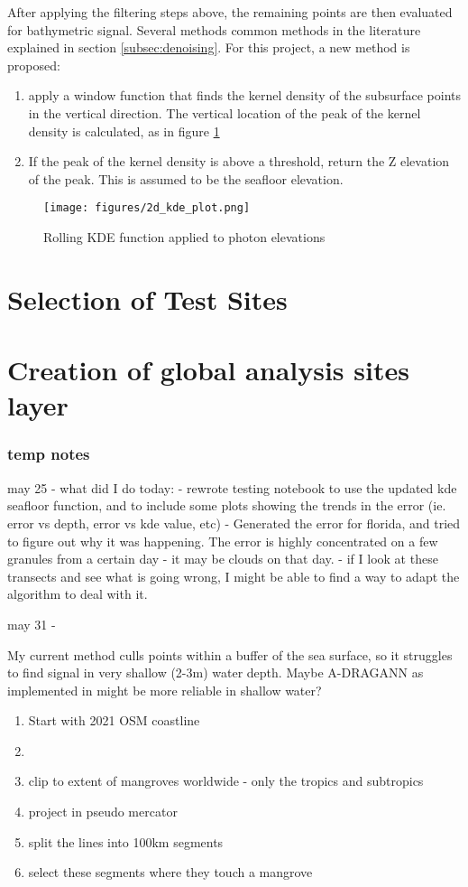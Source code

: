 After applying the filtering steps above, the remaining points are then evaluated for bathymetric signal. Several methods common methods in the literature explained in section \ref{subsec:denoising}. For this project, a new method is proposed:


\begin{enumerate}
    \item apply a window function that finds the kernel density of the subsurface points in the vertical direction. The vertical location of the peak of the kernel density is calculated, as in figure \ref{fig:kdefunc}
    \item If the peak of the kernel density is above a threshold, return the Z elevation of the peak. This is assumed to be the seafloor elevation.
\end{enumerate}

\begin{figure}[htbp]
    \centering
    \texttt{[image: figures/2d\_kde\_plot.png]}
    \caption{Rolling KDE function applied to photon elevations}
    \label{fig:kdefunc}
\end{figure}

\section{Selection of Test Sites}
\section{Creation of global analysis sites layer}
\subsubsection*{temp notes}

may 25 - what did I do today:
- rewrote testing notebook to use the updated kde seafloor function, and to include some plots showing the trends in the error (ie. error vs depth, error vs kde value, etc)
- Generated the error for florida, and tried to figure out why it was happening. The error is highly concentrated on a few granules from a certain day - it may be clouds on that day.
- if I look at these transects and see what is going wrong, I might be able to find a way to adapt the algorithm to deal with it.

may 31 -

My current method culls points within a buffer of the sea surface, so it struggles to find signal in very shallow (2-3m) water depth. Maybe A-DRAGANN as implemented in \cite{Cao2021} might be more reliable in shallow water?
\begin{enumerate}
    \color{orange}
    \item Start with 2021 OSM coastline
    \item 
    \item clip to extent of mangroves worldwide - only the tropics and subtropics
    \item project in pseudo mercator
    \item split the lines into 100km segments
    \item select these segments where they touch a mangrove 
\end{enumerate}


